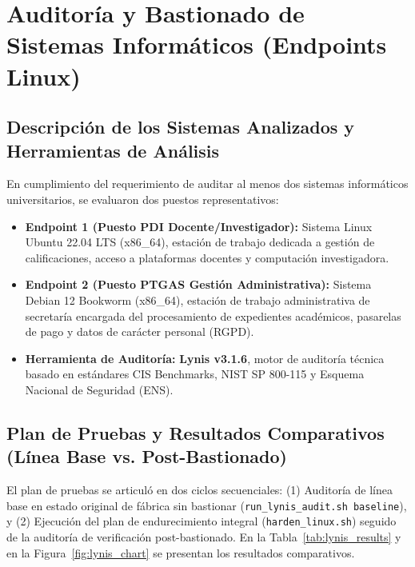 \documentclass[11pt,a4paper]{article}
\begin{document}
\section{Auditoría y Bastionado de Sistemas Informáticos (Endpoints Linux)}

\subsection{Descripción de los Sistemas Analizados y Herramientas de Análisis}
En cumplimiento del requerimiento de auditar al menos dos sistemas informáticos universitarios, se evaluaron dos puestos representativos:
\begin{itemize}[noitemsep]
    \item \textbf{Endpoint 1 (Puesto PDI Docente/Investigador):} Sistema Linux Ubuntu 22.04 LTS (x86\_64), estación de trabajo dedicada a gestión de calificaciones, acceso a plataformas docentes y computación investigadora.
    \item \textbf{Endpoint 2 (Puesto PTGAS Gestión Administrativa):} Sistema Debian 12 Bookworm (x86\_64), estación de trabajo administrativa de secretaría encargada del procesamiento de expedientes académicos, pasarelas de pago y datos de carácter personal (RGPD).
    \item \textbf{Herramienta de Auditoría:} \textbf{Lynis v3.1.6}, motor de auditoría técnica basado en estándares CIS Benchmarks, NIST SP 800-115 y Esquema Nacional de Seguridad (ENS).
\end{itemize}

\subsection{Plan de Pruebas y Resultados Comparativos (Línea Base vs. Post-Bastionado)}
El plan de pruebas se articuló en dos ciclos secuenciales: (1) Auditoría de línea base en estado original de fábrica sin bastionar (\texttt{run\_lynis\_audit.sh baseline}), y (2) Ejecución del plan de endurecimiento integral (\texttt{harden\_linux.sh}) seguido de la auditoría de verificación post-bastionado. En la Tabla~\ref{tab:lynis_results} y en la Figura~\ref{fig:lynis_chart} se presentan los resultados comparativos.
\end{document}
